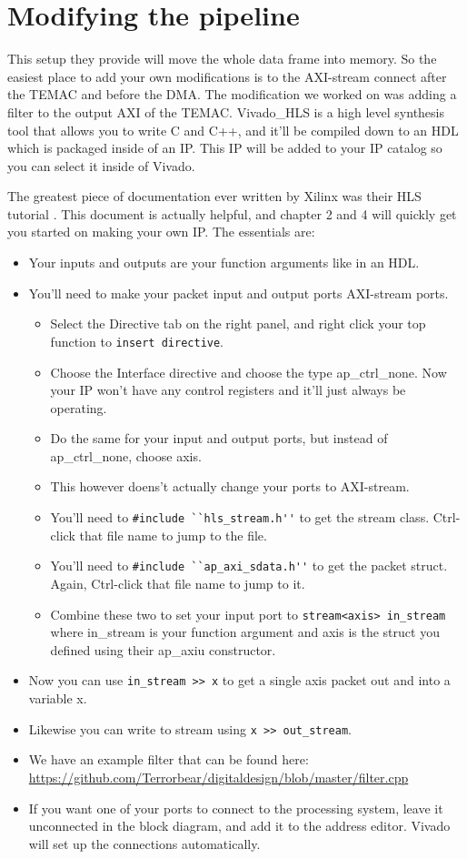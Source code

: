 \documentclass[12pt]{report}
\begin{document}
\section{Modifying the pipeline}
This setup they provide will move the whole data frame into memory. So the easiest place to add your own modifications is to the AXI-stream connect after the TEMAC and before the DMA. The modification we worked on was adding a filter to the output AXI of the TEMAC. Vivado\_HLS is a high level synthesis tool that allows you to write C and C++, and it'll be compiled down to an HDL which is packaged inside of an IP. This IP will be added to your IP catalog so you can select it inside of Vivado.

The greatest piece of documentation ever written by Xilinx was their HLS tutorial \cite{hls_tut}. This document is actually helpful, and chapter 2 and 4 will quickly get you started on making your own IP. The essentials are:
\begin{itemize}
\item Your inputs and outputs are your function arguments like in an HDL.
\item You'll need to make your packet input and output ports AXI-stream ports.
  \begin{itemize}
    \item Select the Directive tab on the right panel, and right click your top function to \texttt{insert directive}.
    \item Choose the Interface directive and choose the type ap\_ctrl\_none. Now your IP won't have any control registers and it'll just always be operating.
    \item Do the same for your input and output ports, but instead of ap\_ctrl\_none, choose axis.
    \item This however doens't actually change your ports to AXI-stream.
    \item You'll need to {\lstinline{#include ``hls_stream.h''}} to get the stream class. Ctrl-click that file name to jump to the file.
    \item You'll need to {\lstinline{#include ``ap_axi_sdata.h''}} to get the packet struct. Again, Ctrl-click that file name to jump to it.
    \item Combine these two to set your input port to {\lstinline{stream<axis> in_stream}} where in\_stream is your function argument and axis is the struct you defined using their ap\_axiu constructor.
    \end{itemize}
  \item Now you can use {\lstinline{in_stream >> x}} to get a single axis packet out and into a variable x.
  \item Likewise you can write to stream using {\lstinline{x >> out_stream}}.
  \item We have an example filter that can be found here: \url{https://github.com/Terrorbear/digitaldesign/blob/master/filter.cpp}
    \item If you want one of your ports to connect to the processing system, leave it unconnected in the block diagram, and add it to the address editor. Vivado will set up the connections automatically.
\end{itemize}
\end{document}

